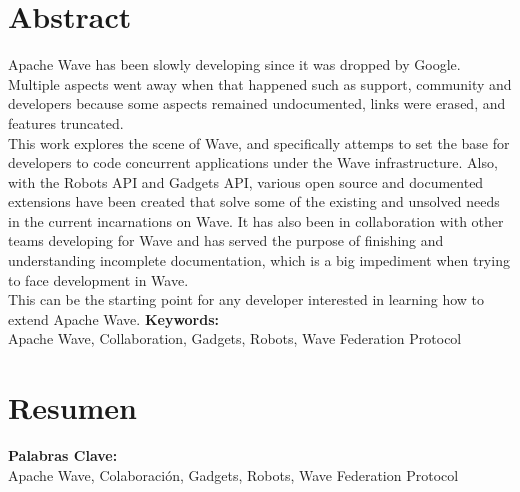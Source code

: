 \newpage
\renewcommand{\thepage}{\Roman{page}}
\setcounter{page}{12}
\chapter*{Abstract}
Apache Wave has been slowly developing since it was dropped by Google. Multiple aspects went away when that happened such as support, community and developers because some aspects remained undocumented, links were erased, and features truncated.\\[.2cm]
This work explores the scene of Wave, and specifically attemps to set the base for developers to code concurrent applications under the Wave infrastructure. Also, with the Robots API and Gadgets API, various open source and documented extensions have been created that solve some of the existing and unsolved needs in the current incarnations on Wave. It has also been in collaboration with other teams developing for Wave and has served the purpose of finishing and understanding incomplete documentation, which is a big impediment when trying to face development in Wave.\\[.2cm]
This can be the starting point for any developer interested in learning how to extend Apache Wave.
\vfill
{\large \bf Keywords:}\\
{\large Apache Wave, Collaboration, Gadgets, Robots, Wave Federation Protocol}

\newpage
\renewcommand{\thepage}{\Roman{page}}
\setcounter{page}{14}
\chapter*{Resumen}

\vfill
{\large \bf Palabras Clave:}\\
{\large Apache Wave, Colaboración, Gadgets, Robots, Wave Federation Protocol}

\newpage
\thispagestyle{empty}
\mbox{}

